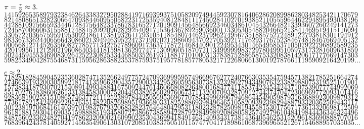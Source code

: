 \documentclass[mathematics_cheat_sheet.tex]{subfiles}
\begin{document}
\vspace{.3\baselineskip}$\pi={\tau\over 2}\approx3.$\\
$1415926535897932384626433832795028841971693993751058209749445923078164062862089986280348253421170679$\\
$8214808651328230664709384460955058223172535940812848111745028410270193852110555964462294895493038196$\\
$4428810975665933446128475648233786783165271201909145648566923460348610454326648213393607260249141273$\\
$7245870066063155881748815209209628292540917153643678925903600113305305488204665213841469519415116094$\\
$3305727036575959195309218611738193261179310511854807446237996274956735188575272489122793818301194912$\\
$9833673362440656643086021394946395224737190702179860943702770539217176293176752384674818467669405132$\\
$0005681271452635608277857713427577896091736371787214684409012249534301465495853710507922796892589235$\\
$4201995611212902196086403441815981362977477130996051870721134999999837297804995105973173281609631859$\\
$5024459455346908302642522308253344685035261931188171010003137838752886587533208381420617177669147303$\\
$598253490428755468731159562863882353787593751957781857780532171226806613001927876611195909216420199\dots$

\vspace{.3\baselineskip}$e\approx2.$\\
$7182818284590452353602874713526624977572470936999595749669676277240766303535475945713821785251664274$\\
$2746639193200305992181741359662904357290033429526059563073813232862794349076323382988075319525101901$\\
$1573834187930702154089149934884167509244761460668082264800168477411853742345442437107539077744992069$\\
$5517027618386062613313845830007520449338265602976067371132007093287091274437470472306969772093101416$\\
$9283681902551510865746377211125238978442505695369677078544996996794686445490598793163688923009879312$\\
$7736178215424999229576351482208269895193668033182528869398496465105820939239829488793320362509443117$\\
$3012381970684161403970198376793206832823764648042953118023287825098194558153017567173613320698112509$\\
$9618188159304169035159888851934580727386673858942287922849989208680582574927961048419844436346324496$\\
$8487560233624827041978623209002160990235304369941849146314093431738143640546253152096183690888707016$\\
$768396424378140592714563549061303107208510383750510115747704171898610687396965521267154688957035035\dots$
\end{document}
